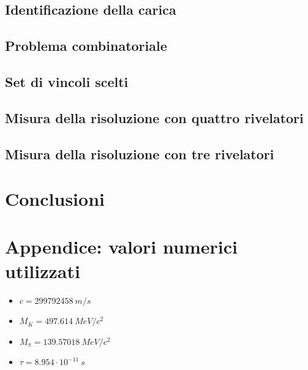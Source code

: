 \documentclass[8pt]{extarticle}
\begin{document}
\subsection{Identificazione della carica}
\subsection{Problema combinatoriale}
\subsection{Set di vincoli scelti}
\subsection{Misura della risoluzione con quattro rivelatori}
\subsection{Misura della risoluzione con tre rivelatori}

\section{Conclusioni} \label{sec:conclusioni}
\section{Appendice: valori numerici utilizzati}
\begin{itemize}
\item $c = 299792458\ m/s$
\item $M_K = 497.614\ MeV/c^2$
\item $M_\pi = 139.57018\ MeV/c^2$
\item $\tau = 8.954\cdot 10^{-11}\ s$
\end{itemize}
\end{document}
